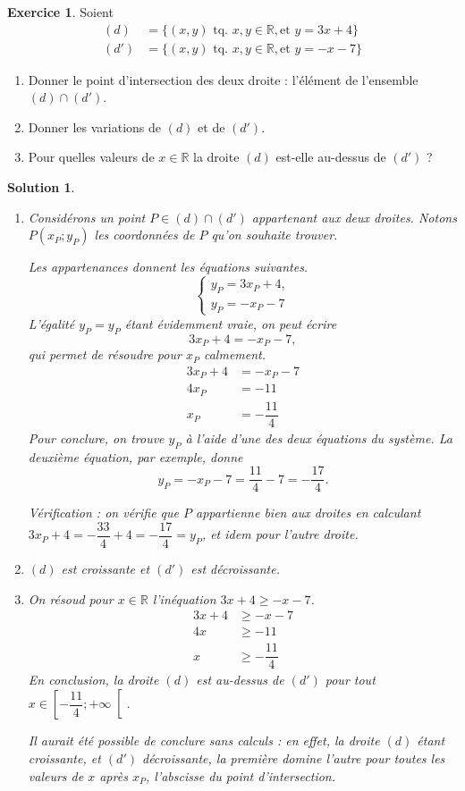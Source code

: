 \documentclass[12pt]{paper}
\theoremstyle{plain}
\newtheorem*{sol}{Solution}
\theoremstyle{definition}
\newtheorem{ex}{Exercice}
\newcommand{\R}{\mathbb{R}}
\newcommand{\exe}[2]{
		\begin{ex} #1  \end{ex}
		\begin{sol} #2 \end{sol}
	}
\newcommand{\exe}[2]{
		\begin{ex} #1  \end{ex}
	}
\begin{document}
\exe{
	Soient 
		\begin{align*}
		(d) &= \{ (x,y) \text{ tq. } x,y\in\R, \text{et }  y=3x+4 \} \\
		(d') &= \{ (x,y) \text{ tq. } x,y\in\R, \text{et }  y=-x-7 \}
		\end{align*}
	\begin{enumerate}
		\item Donner le point d'intersection des deux droite : l'élément de l'ensemble $(d) \cap (d')$.
		\item Donner les variations de $(d)$ et de $(d')$.
		\item Pour quelles valeurs de $x\in\R$ la droite $(d)$ est-elle au-dessus de $(d')$ ?	
	\end{enumerate}
}{
	\begin{enumerate}
		\item Considérons un point $P \in (d) \cap (d')$ appartenant aux deux droites.
		Notons $P(x_P; y_P)$ les coordonnées de $P$ qu'on souhaite trouver.
		
		Les appartenances donnent les équations suivantes.
			\[ \begin{cases*}
				y_P = 3x_P + 4, \\
				y_P = -x_P - 7
			\end{cases*} \]
		L'égalité $y_P = y_P$ étant évidemment vraie, on peut écrire
			\[ 3x_P + 4 = -x_P - 7, \]
		qui permet de résoudre pour $x_P$ calmement.
			\begin{align*}
				 3x_P + 4 &= -x_P - 7 \\
				 4x_P &= -11 \\
				 x_P &= -\dfrac{11}4
			\end{align*}
		Pour conclure, on trouve $y_P$ à l'aide d'une des deux équations du système.
		La deuxième équation, par exemple, donne
			\[ y_P = -x_P - 7 = \dfrac{11}4 - 7 = -\dfrac{17}4. \]
			
		Vérification : on vérifie que $P$ appartienne bien aux droites en calculant $3x_P + 4 = -\dfrac{33}4 + 4 = - \dfrac{17}4 = y_P$, et idem pour l'autre droite.
		\item $(d)$ est croissante et $(d')$ est décroissante.
		\item On résoud pour $x \in \R$ l'inéquation $3x+4 \geq -x-7$.
			\begin{align*}
				3x+4 &\geq -x - 7 \\
				4x &\geq -11 \\
				x &\geq -\dfrac{11}4
			\end{align*}
		En conclusion, la droite $(d)$ est au-dessus de $(d')$ pour tout $x\in \left[-\dfrac{11}4 ; +\infty\right[$.
		
		Il aurait été possible de conclure sans calculs : en effet, la droite $(d)$ étant croissante, et $(d')$ décroissante, la première domine l'autre pour toutes les valeurs de $x$ après $x_P$, l'abscisse du point d'intersection.
	\end{enumerate}
}
\end{document}
